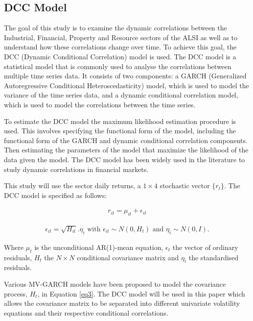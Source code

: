 \documentclass[11pt,preprint, authoryear]{elsarticle}
\numberwithin{equation}{section}
\numberwithin{figure}{section}
\numberwithin{table}{section}
\begin{document}
\hypertarget{dcc-model}{%
\subsection{DCC Model}\label{dcc-model}}

The goal of this study is to examine the dynamic correlations between
the Industrial, Financial, Property and Resource sectors of the ALSI as
well as to understand how these correlations change over time. To
achieve this goal, the DCC (Dynamic Conditional Correlation) model is
used. The DCC model is a statistical model that is commonly used to
analyse the correlations between multiple time series data. It consists
of two components: a GARCH (Generalized Autoregressive Conditional
Heteroscedasticity) model, which is used to model the variance of the
time series data, and a dynamic conditional correlation model, which is
used to model the correlations between the time series.

To estimate the DCC model the maximum likelihood estimation procedure is
used. This involves specifying the functional form of the model,
including the functional form of the GARCH and dynamic conditional
correlation components. Then estimating the parameters of the model that
maximize the likelihood of the data given the model. The DCC model has
been widely used in the literature to study dynamic correlations in
financial markets.

This study will use the sector daily returns, a \(1 \times 4\)
stochastic vector \(\{r_t\}\). The DCC model is specified as follows:

\begin{align}
  r_{it} = \mu_{it} + \epsilon_{it} \label{eq2}
\end{align}

\begin{align}
  \epsilon_{it} = \sqrt{H_{it}}. \eta_i  \text{  with  } \epsilon_{it} \sim N(0, H_t)  \text{  and  } \eta_i \sim N(0, I) . \label{eq3}
\end{align}

Where \(\mu_t\) is the unconditional AR(1)-mean equation, \(\epsilon_t\)
the vector of ordinary residuals, \(H_t\) the \(N \times N\) conditional
covariance matrix and \(\eta_i\) the standardised residuals.

Various MV-GARCH models have been proposed to model the covariance
process, \(H_t\), in Equation \ref{eq3}. The DCC model will be used in
this paper which allows the covariance matrix to be separated into
different univariate volatility equations and their respective
conditional correlations.
\end{document}
